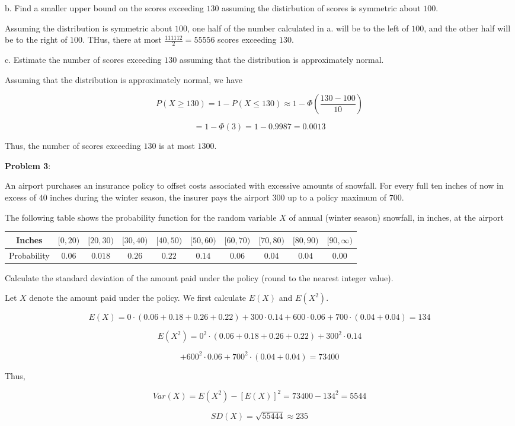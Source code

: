 \documentclass{article}
\begin{document}
\indent\indent b. Find a smaller upper bound on the scores exceeding $130$ assuming the distirbution of scores is symmetric about $100$.

{\color{blue}

Assuming the distribution is symmetric about $100$, one half of the number calculated in a. will be to the left of $100$, and the other half will be to the right of $100$. THus, there at most $\frac{111112}{2}=55556$ scores exceeding $130$.

}

\indent\indent c. Estimate the number of scores exceeding $130$ assuming that the distribution is approximately normal.

{\color{blue}

Assuming that the distribution is approximately normal, we have

\[P(X\ge130)=1-P(X\le130)\approx1-\Phi(\frac{130-100}{10})\]

\[=1-\Phi(3)=1-0.9987=0.0013\]

Thus, the number of scores exceeding $130$ is at most $1300$.

}

\noindent\textbf{Problem 3}:

An airport purchases an insurance policy to offset costs associated with excessive amounts of snowfall. For every full ten inches of now in excess of $40$ inches during the winter season, the insurer pays the airport $300$ up to a policy maximum of $700$.

The following table shows the probability function for the random variable $X$ of annual (winter season) snowfall, in inches, at the airport

\begin{center}
    \begin{tabular}{ |c|c|c|c|c|c|c|c|c|c|}
        \hline
        Inches&$[0,20)$&$[20,30)$&$[30,40)$&$[40,50)$&$[50,60)$&$[60,70)$&$[70,80)$&$[80,90)$&$[90,\infty)$\\
        \hline
        Probability&$0.06$&$0.018$&$0.26$&$0.22$&$0.14$&$0.06$&$0.04$&$0.04$&$0.00$\\
        \hline
    \end{tabular}
\end{center}

Calculate the standard deviation of the amount paid under the policy (round to the nearest integer value).

{\color{blue}

Let $X$ denote the amount paid under the policy. We first calculate $E(X)$ and $E(X^2)$.

\[E(X)=0\cdot(0.06+0.18+0.26+0.22)+300\cdot0.14+600\cdot0.06+700\cdot(0.04+0.04)=134\]

\[E(X^2)=0^2\cdot(0.06+0.18+0.26+0.22)+300^2\cdot0.14\]

\[+600^2\cdot0.06+700^2\cdot(0.04+0.04)=73400\]

Thus,

\[Var(X)=E(X^2)-[E(X)]^2=73400-134^2=5544\]

\[SD(X)=\sqrt{55444}\approx235\]

}
\end{document}
